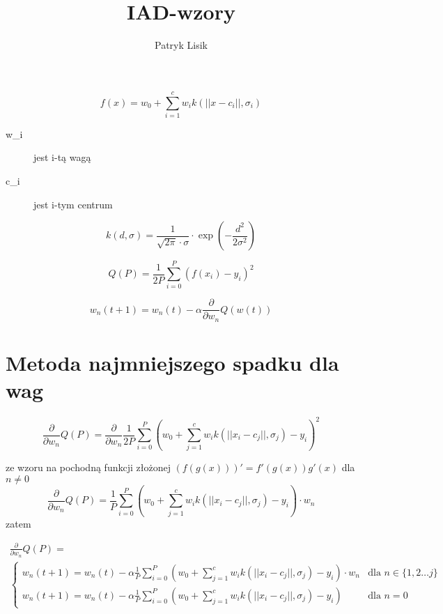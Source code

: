 \documentclass[12pt,a4paper]{article}
\author{Patryk Lisik}
\title{IAD-wzory}
\begin{document}
\maketitle
\begin{equation}\label{eq_1}
f(x)=w_0+\sum^c_{i=1}w_ik(||x-c_i||,\sigma_i )
\end{equation}
\begin{description}
\item[w_i] jest i-tą wagą
\item[c_i] jest i-tym centrum
\end{description}

\begin{equation}\label{eq_2}
k(d,\sigma)=\frac{1}{\sqrt{2\pi}\cdot\sigma }\cdot \exp\left( -\frac{d^2}{2\sigma ^2}\right) 
\end{equation}

\begin{equation}\label{eq_3}
Q(P)=\frac{1}{2P} \sum^P_{i=0} \left(f(x_i)-y_i\right) ^2
\end{equation}

\begin{equation}\label{eq_4}
w_n(t+1)=w_n(t)-\alpha \frac{\partial}{\partial w_n}Q(w(t))
\end{equation}

\section{Metoda najmniejszego spadku dla wag}

$$
\frac{\partial}{\partial w_n}Q(P)=\frac{\partial}{\partial w_n}\frac{1}{2P} \sum^P_{i=0} \left(w_0+\sum^c_{j=1}w_ik(||x_i-c_j||,\sigma_j )-y_i\right) ^2
$$

ze wzoru na pochodną funkcji złożonej $\left(f(g(x))\right)'=f'(g(x))g'(x)$
dla $n\neq 0$
$$
\frac{\partial}{\partial w_n}Q(P)=\frac{1}{P} \sum^P_{i=0} \left(w_0+\sum^c_{j=1}w_ik(||x_i-c_j||,\sigma_j )-y_i\right)\cdot w_n
$$
zatem

\begin{gather*}   
\frac{\partial}{\partial w_n}Q(P)=\\
\begin{cases}
  w_n(t+1)=w_n(t)-\alpha \frac{1}{P} \sum^P_{i=0} \left(w_0+\sum^c_{j=1}			w_ik(||x_i-c_j||,\sigma_j )-y_i\right)\cdot w_n & \text{dla } 
  n\in\{1,2\ldots j\}\\      
  w_n(t+1)=w_n(t)-\alpha \frac{1}{P} \sum^P_{i=0} \left(w_0+\sum^c_{j=1}			w_ik(||x_i-c_j||,\sigma_j )-y_i\right)  & \text{dla } n=0  
\end{cases}
\end{gather*}
\end{document}
